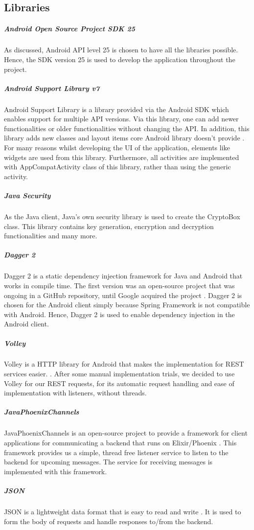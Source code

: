 \documentclass[11pt,a4paper]{report}
\begin{document}
\subsection{Libraries}
\subparagraph{Android Open Source Project SDK 25}
As discussed, Android API level 25 is chosen to have all the libraries possible. Hence, the SDK version 25 is used to develop the application throughout the project.
\subparagraph{Android Support Library v7}
Android Support Library is a library provided via the Android SDK which enables support for multiple API versions. Via this library, one can add newer functionalities or older functionalities without changing the API. In addition, this library adds new classes and layout items core Android library doesn’t provide \cite{website:android_support_library}. For many reasons whilst developing the UI of the application, elements like widgets are used from this library. Furthermore, all activities are implemented with AppCompatActivity class of this library, rather than using the generic activity.
\subparagraph{Java Security}
As the Java client, Java’s own security library is used to create the CryptoBox class. This library contains key generation, encryption and decryption functionalities and many more.
\subparagraph{Dagger 2}
Dagger 2 is a static dependency injection framework for Java and Android that works in compile time. The first version was an open-source project that was ongoing in a GitHub repository, until Google acquired the project \cite{website:dagger_homepage}. Dagger 2 is chosen for the Android client simply because Spring Framework is not compatible with Android. Hence, Dagger 2 is used to enable dependency injection in the Android client.
\subparagraph{Volley}
Volley is a HTTP library for Android that makes the implementation for REST services easier. \cite{website:volley_homepage}. After some manual implementation trials, we decided to use Volley for our REST requests, for its automatic request handling and ease of implementation with listeners, without threads.
\subparagraph{JavaPhoenixChannels}
JavaPhoenixChannels is an open-source project to provide a framework for client applications for communicating a backend that runs on Elixir/Phoenix \cite{website:java_phoenix_channels_homepage}. This framework provides us a simple, thread free listener service to listen to the backend for upcoming messages. The service for receiving messages is implemented with this framework.
\subparagraph{JSON}
JSON is a lightweight data format that is easy to read and write \cite{website:json_homepage}. It is used to form the body of requests and handle responses to/from the backend.
\end{document}
